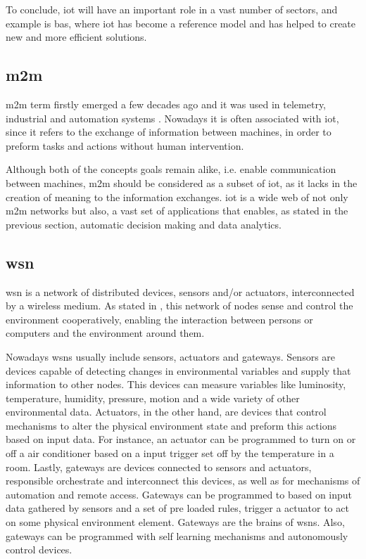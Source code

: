 To conclude, \ac{iot} will have an important role in a vast number of sectors, and example is \ac{bas}, where \ac{iot} has become a reference model and has helped to create new and more efficient solutions.



\subsection{\acf{m2m}}

\acf{m2m} term firstly emerged a few decades ago and it was used in telemetry, industrial and automation systems \cite{}. Nowadays it is often associated with \ac{iot}, since it refers to the exchange of information between machines, in order to preform tasks and actions without human intervention.

Although both of the concepts goals remain alike, i.e. enable communication between machines, \ac{m2m} should be considered as a subset of \ac{iot}, as it lacks in the creation of meaning to the information exchanges. \ac{iot} is a wide web of not only \ac{m2m} networks but also, a vast set of applications that enables, as stated in the previous section, automatic decision making and data analytics. 

\subsection{\acf{wsn}}

\acf{wsn} is a network of distributed devices, sensors and/or actuators, interconnected by a wireless medium. As stated in \cite{IEC2014a}, this network of nodes sense and control the environment cooperatively, enabling the interaction between persons or computers and the environment around them. 

Nowadays \ac*{wsn}s usually include sensors, actuators and gateways. Sensors are devices capable of detecting changes in environmental variables and supply that information to other nodes. This devices can measure variables like luminosity, temperature, humidity, pressure, motion and a wide variety of other environmental data. Actuators, in the other hand, are devices that control mechanisms to alter the physical environment state and preform this actions based on input data. For instance, an actuator can be programmed to turn on or off a air conditioner based on a input trigger set off by the temperature in a room.
Lastly, gateways are devices connected to sensors and actuators, responsible orchestrate and interconnect this devices, as well as for mechanisms of automation and remote access. Gateways can be programmed to based on input data gathered by sensors and a set of pre loaded rules, trigger a actuator to act on some physical environment element. Gateways are the brains of \ac{wsn}s. Also, gateways can be programmed with self learning mechanisms and autonomously control devices. 

